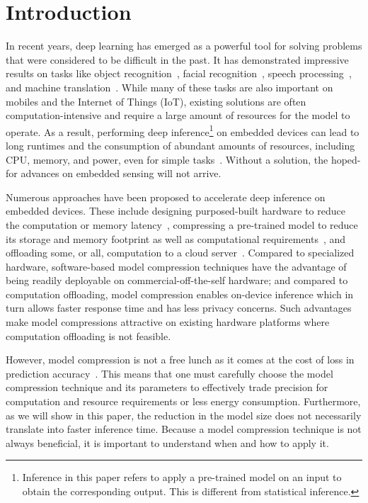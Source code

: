 \section{Introduction}
In recent years, deep learning has emerged as a powerful tool for solving problems that were considered to be difficult in the past. It has
demonstrated impressive results on tasks like object recognition~\cite{donahue14,he2016deep}, facial
recognition~\cite{parkhi2015deep,sun2014deep}, speech processing~\cite{pmlrv48amodei16}, and machine translation~\cite{bahdanau2014neural}.
While many of these tasks are also important on mobiles and the Internet of Things (IoT), existing solutions are often
computation-intensive and require a large amount of resources for the model to operate. As a result, performing deep
inference\footnote{Inference in this paper refers to apply a pre-trained model on an input to obtain the corresponding output. This is
different from statistical inference.} on embedded devices can lead to long runtimes and the consumption of abundant amounts of resources,
including CPU, memory, and power, even for simple tasks~\cite{CanzianiPC16}. Without a solution,
 the hoped-for advances on embedded sensing will not arrive.


Numerous approaches have been proposed to accelerate deep inference on embedded devices. These include designing purposed-built hardware to
reduce the computation or memory latency~\cite{}, compressing a pre-trained model to reduce its storage and memory footprint as well as
computational requirements~\cite{}, and offloading some, or all, computation to a cloud
server~\cite{Kang2017neurosurgeon,teerapittayanon2017distributed}. Compared to specialized hardware, software-based model compression
techniques have the advantage of being readily deployable on commercial-off-the-self hardware; and compared to computation offloading,
model compression enables on-device inference which in turn allows faster response time and has less privacy concerns. Such advantages make
model compressions attractive on existing hardware platforms where computation offloading is not feasible.


However, model compression is not a free lunch as it comes at the cost of loss in prediction accuracy~\cite{}. This means that one must
carefully choose the model compression technique and its parameters to effectively trade precision for computation and resource
requirements or less energy consumption. Furthermore, as we will show in this paper, the reduction in the model size does not necessarily
translate into faster inference time. Because a model compression technique is not always beneficial, it is important to understand when
and how to apply it.

